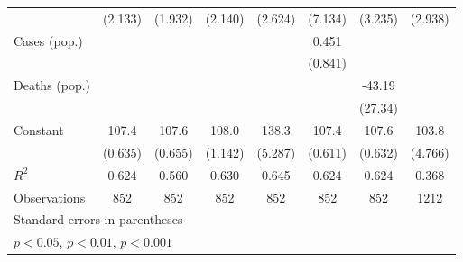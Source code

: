 \documentclass{article}
\begin{document}
{\begin{longtable}{l*{7}{c}}
                &  (2.133)         &  (1.932)         &  (2.140)         &  (2.624)         &  (7.134)         &  (3.235)         &  (2.938)         \\
Cases (pop.)    &                  &                  &                  &                  &    0.451         &                  &                  \\
                &                  &                  &                  &                  &  (0.841)         &                  &                  \\
Deaths (pop.)   &                  &                  &                  &                  &                  &   -43.19         &                  \\
                &                  &                  &                  &                  &                  &  (27.34)         &                  \\
Constant        &    107.4\sym{***}&    107.6\sym{***}&    108.0\sym{***}&    138.3\sym{***}&    107.4\sym{***}&    107.6\sym{***}&    103.8\sym{***}\\
                &  (0.635)         &  (0.655)         &  (1.142)         &  (5.287)         &  (0.611)         &  (0.632)         &  (4.766)         \\
\hline
\(R^{2}\)       &    0.624         &    0.560         &    0.630         &    0.645         &    0.624         &    0.624         &    0.368         \\
Observations    &      852         &      852         &      852         &      852         &      852         &      852         &     1212         \\
\hline\hline
\multicolumn{8}{l}{\footnotesize Standard errors in parentheses}\\
\multicolumn{8}{l}{\footnotesize \sym{*} \(p<0.05\), \sym{**} \(p<0.01\), \sym{***} \(p<0.001\)}\\
\end{longtable}
}
\end{document}
